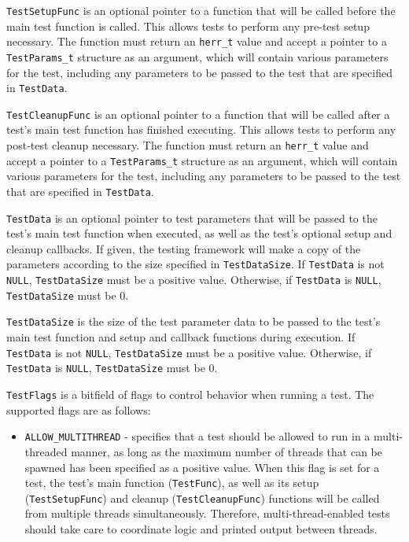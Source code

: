 \documentclass[../HDF5_RFC.tex]{subfiles}
\begin{document}
\texttt{TestSetupFunc} is an optional pointer to a function that will be called before the main test
function is called. This allows tests to perform any pre-test setup necessary. The function must
return an \texttt{herr\_t} value and accept a pointer to a \texttt{TestParams\_t} structure as an
argument, which will contain various parameters for the test, including any parameters to be passed
to the test that are specified in \texttt{TestData}.

\texttt{TestCleanupFunc} is an optional pointer to a function that will be called after a test's
main test function has finished executing. This allows tests to perform any post-test cleanup
necessary. The function must return an \texttt{herr\_t} value and accept a pointer to a
\texttt{TestParams\_t} structure as an argument, which will contain various parameters for the test,
including any parameters to be passed to the test that are specified in \texttt{TestData}.

\texttt{TestData} is an optional pointer to test parameters that will be passed to the test's main
test function when executed, as well as the test's optional setup and cleanup callbacks. If given,
the testing framework will make a copy of the parameters according to the size specified in
\texttt{TestDataSize}. If \texttt{TestData} is not \texttt{NULL}, \texttt{TestDataSize} must be a
positive value. Otherwise, if \texttt{TestData} is \texttt{NULL}, \texttt{TestDataSize} must be 0.

\texttt{TestDataSize} is the size of the test parameter data to be passed to the test's main test
function and setup and callback functions during execution. If \texttt{TestData} is not \texttt{NULL},
\texttt{TestDataSize} must be a positive value. Otherwise, if \texttt{TestData} is \texttt{NULL},
\texttt{TestDataSize} must be 0.

\texttt{TestFlags} is a bitfield of flags to control behavior when running a test. The supported
flags are as follows:

\begin{itemize}
    \item \texttt{ALLOW\_MULTITHREAD} - specifies that a test should be allowed to run in a
          multi-threaded manner, as long as the maximum number of threads that can be spawned
          has been specified as a positive value. When this flag is set for a test, the test's
          main function (\texttt{TestFunc}), as well as its setup (\texttt{TestSetupFunc}) and
          cleanup (\texttt{TestCleanupFunc}) functions will be called from multiple threads
          simultaneously. Therefore, multi-thread-enabled tests should take care to coordinate
          logic and printed output between threads.
\end{itemize}
\end{document}
